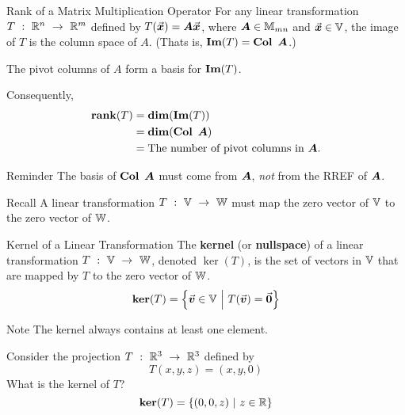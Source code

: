 \documentclass{beamer}
\begin{document}
\begin{frame}
\begin{block}{Rank of a Matrix Multiplication Operator}
For any linear transformation $T\ :\ \mathbb{R}^n\ \rightarrow\ \mathbb{R}^m$ defined by $T({\vec{\boldsymbol{x}}})=\boldsymbol{A}{\vec{\boldsymbol{x}}}$, where $\boldsymbol{A}\in\mathbb{M}_{mn}$ and ${\vec{\boldsymbol{x}}}\in\mathbb{V}$, the image of $T$ is the column space of $A$. (Thats is, $\im(T)=\Col\mat{A}$.) 

\vspace{2mm}
The pivot columns of $A$ form a basis for $\operatorname{\textbf{Im}}(T)$.

\vspace{2mm}
Consequently,
\begin{equation*}
\begin{aligned}
\rank(T) &= \dim(\im(T))\\
		 &= \dim(\Col\mat{A})\\
		 &= \text{The number of pivot columns in $\mat{A}$.}
\end{aligned}
\end{equation*}
\end{block}\pause
\begin{block}{Reminder}
The basis of $\Col\mat{A}$ must come from $\boldsymbol{A}$, \emph{not} from the RREF of $\boldsymbol{A}$.
\end{block}
\end{frame}

\begin{frame}
\begin{block}{Recall}
A linear transformation $T\ :\ \mathbb{V}\ \rightarrow\ \mathbb{W}$ must map the zero vector of $\mathbb{V}$ to the zero vector of $\mathbb{W}$.
\end{block}\pause
\begin{block}{Kernel of a Linear Transformation}
The \textbf{kernel} (or \textbf{nullspace}) of a linear transformation $T\ :\ \mathbb{V}\ \rightarrow\ \mathbb{W}$, denoted $\ker(T)$, is the set of vectors in $\mathbb{V}$ that are mapped by $T$ to the zero vector of $\mathbb{W}$.
\begin{equation*}
\operatorname{\textbf{ker}}(T)=\left\{{\vec{\boldsymbol{v}}}\in\mathbb{V}\ \middle|\ T({\vec{\boldsymbol{v}}})={\vec{\boldsymbol{0}}}\right\}
\end{equation*}
\end{block}\pause
\begin{block}{Note}
The kernel always contains at least one element.
\end{block}
\end{frame}

\begin{frame}
\begin{example}
Consider the projection $T\ :\ \mathbb{R}^3\ \rightarrow\ \mathbb{R}^3$ defined by
\begin{equation*}
T(x,y,z)=(x,y,0)
\end{equation*}
What is the kernel of $T$?\pause
\begin{equation*}
\operatorname{\textbf{ker}}(T)=\left\{(0,0,z)\ \middle|\ z\in\mathbb{R}\right\}
\end{equation*}
\end{example}
\end{frame}
\end{document}
